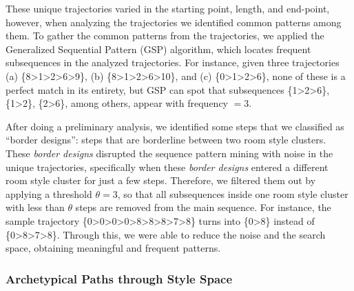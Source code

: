 These unique trajectories varied in the starting point, length, and end-point, however, when analyzing the trajectories we identified common patterns among them. To gather the common patterns from the trajectories, we applied the Generalized Sequential Pattern (GSP) algorithm, which locates frequent subsequences in the analyzed trajectories. For instance, given three trajectories (a) \{8\textgreater1\textgreater2\textgreater6\textgreater9\}, (b) \{8\textgreater1\textgreater2\textgreater6\textgreater10\}, and (c) \{0\textgreater1\textgreater2\textgreater6\}, none of these is a perfect match in its entirety, but GSP can spot that subsequences \{1\textgreater2\textgreater6\}, \{1\textgreater2\}, \{2\textgreater6\}, among others, appear with frequency $= 3$.


After doing a preliminary analysis, we identified some steps that we classified as ``border designs'': steps that are borderline between two room style clusters. These \textit{border designs} disrupted the sequence pattern mining with noise in the unique trajectories, specifically when these \textit{border designs} entered a different room style cluster for just a few steps. %
Therefore, we filtered them out by applying a threshold $\theta = 3$, so that all subsequences inside one room style cluster with less than $\theta$ steps are removed from the main sequence. For instance, the sample trajectory \{0\textgreater0\textgreater0\textgreater0\textgreater8\textgreater8\textgreater8\textgreater7\textgreater8\} turns into \{0\textgreater8\} instead of \{0\textgreater8\textgreater7\textgreater8\}. Through this, we were able to reduce the noise and the search space, obtaining meaningful and frequent patterns.

\subsubsection{Archetypical Paths through Style Space}
\label{sec:archetypical-paths}




